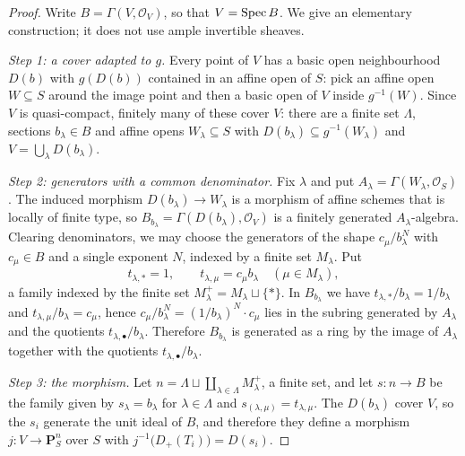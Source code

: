 \begin{proof}
\leanok
Write $B=\Gamma(V,\mathcal O_V)$, so that $V=\operatorname{Spec} B$.  We give an elementary
construction; it does not use ample invertible sheaves.

\emph{Step 1: a cover adapted to $g$.}  Every point of $V$ has a basic open
neighbourhood $D(b)$ with $g(D(b))$ contained in an affine open of $S$: pick an
affine open $W\subseteq S$ around the image point and then a basic open of $V$
inside $g^{-1}(W)$.  Since $V$ is quasi-compact, finitely many of these cover
$V$: there are a finite set $\Lambda$, sections $b_\lambda\in B$ and affine
opens $W_\lambda\subseteq S$ with $D(b_\lambda)\subseteq g^{-1}(W_\lambda)$ and
$V=\bigcup_{\lambda}D(b_\lambda)$.

\emph{Step 2: generators with a common denominator.}  Fix $\lambda$ and put
$A_\lambda=\Gamma(W_\lambda,\mathcal O_S)$.  The induced morphism
$D(b_\lambda)\to W_\lambda$ is a morphism of affine schemes that is locally of
finite type, so $B_{b_\lambda}=\Gamma(D(b_\lambda),\mathcal O_V)$ is a finitely
generated $A_\lambda$-algebra.  Clearing denominators, we may choose the
generators of the shape $c_\mu/b_\lambda^{N}$ with $c_\mu\in B$ and a single
exponent $N$, indexed by a finite set $M_\lambda$.  Put
\[
  t_{\lambda,\ast}=1,\qquad t_{\lambda,\mu}=c_\mu b_\lambda
  \quad(\mu\in M_\lambda),
\]
a family indexed by the finite set $M_\lambda^{+}=M_\lambda\sqcup\{\ast\}$.
In $B_{b_\lambda}$ we have $t_{\lambda,\ast}/b_\lambda=1/b_\lambda$ and
$t_{\lambda,\mu}/b_\lambda=c_\mu$, hence
$c_\mu/b_\lambda^{N}=(1/b_\lambda)^{N}\cdot c_\mu$ lies in the subring
generated by $A_\lambda$ and the quotients $t_{\lambda,\bullet}/b_\lambda$.
Therefore $B_{b_\lambda}$ is generated as a ring by the image of $A_\lambda$
together with the quotients $t_{\lambda,\bullet}/b_\lambda$.

\emph{Step 3: the morphism.}  Let
$n=\Lambda\sqcup\coprod_{\lambda\in\Lambda}M_\lambda^{+}$, a finite set, and
let $s\colon n\to B$ be the family given by $s_\lambda=b_\lambda$ for
$\lambda\in\Lambda$ and $s_{(\lambda,\mu)}=t_{\lambda,\mu}$.  The
$D(b_\lambda)$ cover $V$, so the $s_i$ generate the unit ideal of $B$, and
therefore they define a morphism $j\colon V\to\mathbf P^n_S$ over $S$ with
$j^{-1}\bigl(D_+(T_i)\bigr)=D(s_i)$.


\end{proof}
